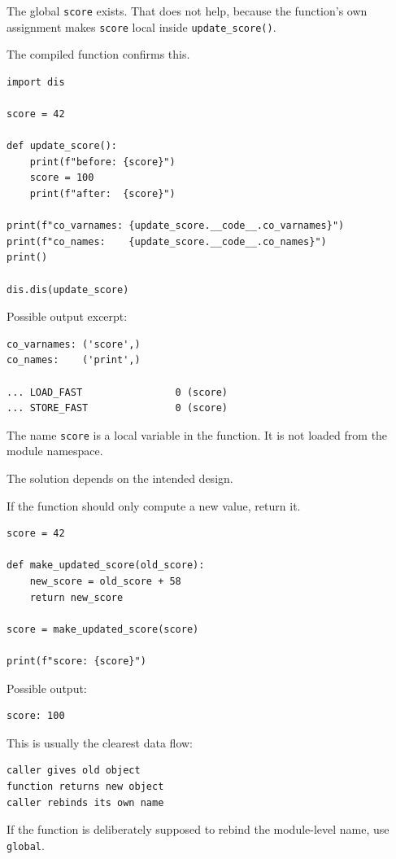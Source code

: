 The global \texttt{score} exists. That does not help, because the function's own assignment makes \texttt{score} local inside \texttt{update\_score()}.

The compiled function confirms this.

\begin{verbatim}
import dis

score = 42

def update_score():
    print(f"before: {score}")
    score = 100
    print(f"after:  {score}")

print(f"co_varnames: {update_score.__code__.co_varnames}")
print(f"co_names:    {update_score.__code__.co_names}")
print()

dis.dis(update_score)
\end{verbatim}

Possible output excerpt:

\begin{verbatim}
co_varnames: ('score',)
co_names:    ('print',)

... LOAD_FAST                0 (score)
... STORE_FAST               0 (score)
\end{verbatim}

The name \texttt{score} is a local variable in the function. It is not loaded from the module namespace.

The solution depends on the intended design.

If the function should only compute a new value, return it.

\begin{verbatim}
score = 42

def make_updated_score(old_score):
    new_score = old_score + 58
    return new_score

score = make_updated_score(score)

print(f"score: {score}")
\end{verbatim}

Possible output:

\begin{verbatim}
score: 100
\end{verbatim}

This is usually the clearest data flow:

\begin{verbatim}
caller gives old object
function returns new object
caller rebinds its own name
\end{verbatim}

If the function is deliberately supposed to rebind the module-level name, use \texttt{global}.

